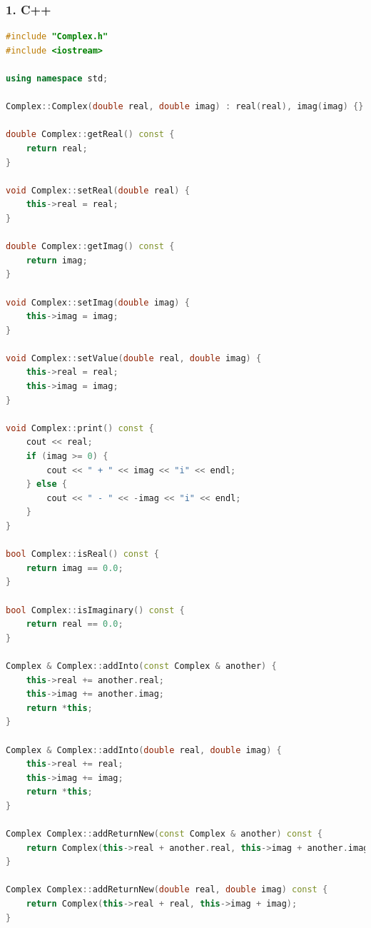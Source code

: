 \documentclass{article}
\begin{document}
\subsubsection*{1. C++}
\begin{lstlisting}[language=C++, caption=Complex.cpp]
#include "Complex.h"
#include <iostream>

using namespace std;

Complex::Complex(double real, double imag) : real(real), imag(imag) {}

double Complex::getReal() const {
    return real;
}

void Complex::setReal(double real) {
    this->real = real;
}

double Complex::getImag() const {
    return imag;
}

void Complex::setImag(double imag) {
    this->imag = imag;
}

void Complex::setValue(double real, double imag) {
    this->real = real;
    this->imag = imag;
}

void Complex::print() const {
    cout << real;
    if (imag >= 0) {
        cout << " + " << imag << "i" << endl;
    } else {
        cout << " - " << -imag << "i" << endl;
    }
}

bool Complex::isReal() const {
    return imag == 0.0;
}

bool Complex::isImaginary() const {
    return real == 0.0;
}

Complex & Complex::addInto(const Complex & another) {
    this->real += another.real;
    this->imag += another.imag;
    return *this;
}

Complex & Complex::addInto(double real, double imag) {
    this->real += real;
    this->imag += imag;
    return *this;
}

Complex Complex::addReturnNew(const Complex & another) const {
    return Complex(this->real + another.real, this->imag + another.imag);
}

Complex Complex::addReturnNew(double real, double imag) const {
    return Complex(this->real + real, this->imag + imag);
}
\end{lstlisting}
\end{document}
